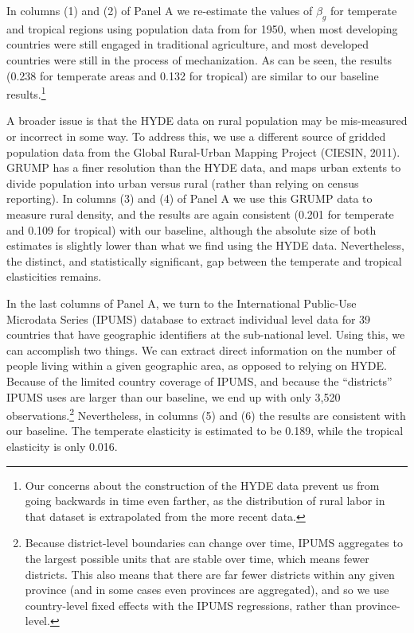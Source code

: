\documentclass[11pt]{article}
\begin{document}
In columns (1) and (2) of Panel A we re-estimate the values of $\beta_g$ for temperate and tropical regions using population data from \citet{hyde31} for 1950, when most developing countries were still engaged in traditional agriculture, and most developed countries were still in the process of mechanization. As can be seen, the results (0.238 for temperate areas and 0.132 for tropical) are similar to our baseline results.\footnote{Our concerns about the construction of the HYDE data prevent us from going backwards in time even farther, as the distribution of rural labor in that dataset is extrapolated from the more recent data.}

A broader issue is that the HYDE data on rural population may be mis-measured or incorrect in some way. To address this, we use a different source of gridded population data from the Global Rural-Urban Mapping Project (CIESIN, 2011). GRUMP has a finer resolution than the HYDE data, and maps urban extents to divide population into urban versus rural (rather than relying on census reporting). In columns (3) and (4) of Panel A we use this GRUMP data to measure rural density, and the results are again consistent (0.201 for temperate and 0.109 for tropical) with our baseline, although the absolute size of both estimates is slightly lower than what we find using the HYDE data. Nevertheless, the distinct, and statistically significant, gap between the temperate and tropical elasticities remains.

In the last columns of Panel A, we turn to the International Public-Use Microdata Series (IPUMS) database \nocite{ipums} to extract individual level data for 39 countries that have geographic identifiers at the sub-national level. Using this, we can accomplish two things. We can extract direct information on the number of people living within a given geographic area, as opposed to relying on HYDE. Because of the limited country coverage of IPUMS, and because the ``districts'' IPUMS uses are larger than our baseline, we end up with only 3,520 observations.\footnote{Because district-level boundaries can change over time, IPUMS aggregates to the largest possible units that are stable over time, which means fewer districts. This also means that there are far fewer districts within any given province (and in some cases even provinces are aggregated), and so we use country-level fixed effects with the IPUMS regressions, rather than province-level.} Nevertheless, in columns (5) and (6) the results are consistent with our baseline. The temperate elasticity is estimated to be 0.189, while the tropical elasticity is only 0.016. 
\end{document}
